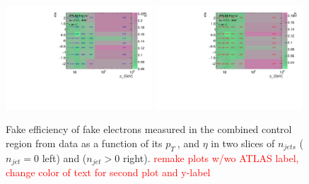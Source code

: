 \begin{figure}[htb]
		\begin{center}
		\includegraphics[width = 0.49\textwidth]{figures/Analysis/Background/njet0_FakeEfficiency3D_el_pt_eta.pdf}
		\includegraphics[width = 0.49\textwidth]{figures/Analysis/Background/njet1_FakeEfficiency3D_el_pt_eta.pdf} 
		\end{center}
	\caption{Fake efficiency of fake electrons measured in the combined control region from data as a function of its $p_{T}~$, and $\eta$ in two slices of $n_{jets}$ ($n_{jet} = 0$ left) and ($n_{jet} > 0$ right). \textcolor{red}{remake plots w/wo ATLAS label, change color of text for second plot and y-label} \label{fig:ElecFakeEff}}
\end{figure}

